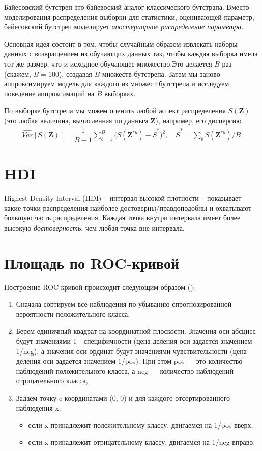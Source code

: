 \documentclass[%
	11pt,
	a4paper,
	utf8,
		]{article}
\begin{document}
Байесовский бутстреп это байевоский аналог классического бутстрапа. Вместо моделирования распределения выборки для статистики, оценивающей параметр, байесовский бутстреп моделирует \emph{апостериорное распределение параметра}. 

Основная идея состоит в том, чтобы случайным образом извлекать наборы данных с \underline{возвращением} из обучающих данных так, чтобы каждая выборка имела тот же размер, что и исходное обучающее множество.Это делается $ B $ раз (скажем, $ B = 100 $), создавая $ B $ множеств бутстрепа. Затем мы заново аппроксимируем модель для каждого из множест бутстрепа и исследуем поведение аппроксимаций на $ B $ выборках.

По выборке бутстрепа мы можем оценить любой аспект распределения $ S(\mathbf{Z}) $ (это любая величина, вычисленная по данным $ \mathbf{Z} $), например, его дисперсию
\begin{align*}
	\widehat{ Var }[ S(\mathbf{Z}) ] = \dfrac{1}{B - 1} \sum_{b=1}^{B} \Big( S(\mathbf{Z}^{*b})  - \bar{S}^* \Big)^2, \quad \bar{S}^{*} = \sum_b S( \mathbf{Z}^{*b} ) / B.
\end{align*}

\section{HDI}

Highest Density Interval (HDI) -- интервал высокой плотности -- показывает какие точки распределения наиболее достоверны/правдоподобны и охватывают большую часть распределения. Каждая точка внутри интервала имеет более высокую \emph{достоверность}, чем любая точка вне интервала.

\section{Площадь по ROC-кривой}

Построение ROC-кривой происходит следующим образом ():
\begin{enumerate}
	\item  Сначала сортируем все наблюдения по убыванию спрогнозированной вероятности положительного класса,
	
	\item Берем единичный квадрат на координатной плоскости. Значения оси абсцисс будут значениями 1 - специфичности (цена деления оси задается значением 1/neg), а значения оси ординат будут значениями чувствительности (цена деления оси задается значением 1/pos). При этом pos — это количество наблюдений положительного класса, а neg — количество наблюдений отрицательного класса,
	
	\item Задаем точку c координатами (0, 0) и для каждого отсортированного наблюдения x:
	\begin{itemize}
		\item если x принадлежит положительному классу, двигаемся на 1/pos вверх,
		
		\item если x принадлежит отрицательному классу, двигаемся на 1/neg вправо.
	\end{itemize}
\end{enumerate}
\end{document}
